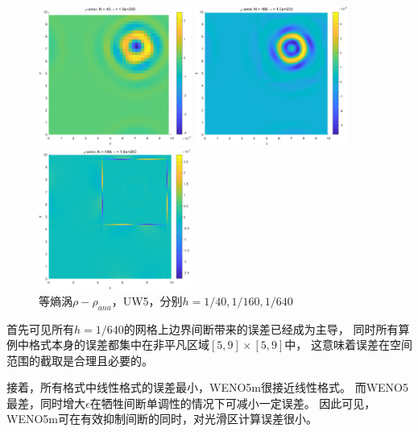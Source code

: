 \documentclass[UTF8,zihao=5]{ctexart} %
\begin{document}
\begin{figure}[H]
    \begin{minipage}[c]{0.32\linewidth}  %
        \centering
        \includegraphics[width=5cm]{Err_40_LIN.png}  %
    \end{minipage}
    \hfill %
    \begin{minipage}[c]{0.32\linewidth}  %
        \centering
        \includegraphics[width=5cm]{Err_160_LIN.png}  %
    \end{minipage}
    \hfill %
    \begin{minipage}[c]{0.32\linewidth}  %
        \centering
        \includegraphics[width=5cm]{Err_640_LIN.png}  %
    \end{minipage}
    \caption{等熵涡$\rho-\rho_{ana}$，UW5，分别$h=1/40,1/160,1/640$}
\end{figure}
首先可见所有$h=1/640$的网格上边界间断带来的误差已经成为主导，
同时所有算例中格式本身的误差都集中在非平凡区域$[5,9]\times[5,9]$中，
这意味着误差在空间范围的截取是合理且必要的。

接着，所有格式中线性格式的误差最小，WENO5m很接近线性格式。
而WENO5最差，同时增大$\epsilon$在牺牲间断单调性的情况下可减小一定误差。
因此可见，WENO5m可在有效抑制间断的同时，对光滑区计算误差很小。
\end{document}
